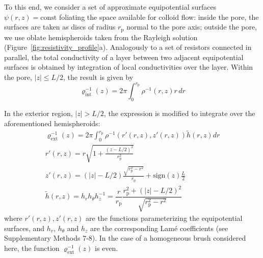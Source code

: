 \documentclass[12pt, a4paper]{article}
\begin{document}

To this end, we consider a set of approximate equipotential surfaces $\psi(r,z)=\text{const}$ foliating the space available for colloid flow: inside the pore, the surfaces are taken as  discs of radius $r_{\text{p}}$ normal to the pore axis; outside the pore, we use oblate hemispheroids taken from the Rayleigh solution \cite{Strutt1878} (Figure~\ref{fig:resistivity_profile}a).
Analogously to a set of resistors connected in parallel, the total conductivity of a layer between two adjacent equipotential surfaces is obtained by integration of local conductivities over the layer. Within the pore, $|z|\leq L/2$, the result is given by
\begin{equation}
\varrho_{\text{int}}^{-1}(z)= 2\pi\int_{0}^{r_{\text{p}}^{}} \rho^{-1}(r,z) r \, dr
\label{eq:varrho1}
\end{equation}

In the exterior region, $|z| >L/2$, the expression is modified to integrate over the aforementioned hemispheroids:
\begin{equation}
    \begin{gathered}
        \varrho_{\text{ext}}^{-1}(z)= 2\pi\int_{0}^{r_{\text{p}}^{}} \rho^{-1}\left( r'(r,z), z'(r,z) \right)  \tilde{h} (r,z) dr\\
        r'(r,z) = r\sqrt{1 + \frac{(z - L/2)^2}{r_{\text{p}}^2}}\\
        z'(r,z) = (|z| - L/2) \frac{\sqrt{r_{\text{p}}^2 - r^2}}{r_{\text{p}}} +  \text{sign}(z) \frac{L}{2}\\
        \tilde{h} (r,z) = h_r h_{\theta} h_z^{-1} = \dfrac{r}{r_{\text{p}}}\dfrac{r_{\text{p}}^2 + (|z|-L/2)^2}{\sqrt{r_{\text{p}}^2 - r^2}}
    \end{gathered}
\label{eq:varrho2}
\end{equation}
where $r'(r,z) , z'(r,z)$ are the functions parameterizing the equipotential surfaces, and $h_r$, $h_{\theta}$ and $h_z$ are the corresponding Lam\'e coefficients (see Supplementary Methods 7-8). In the case of a homogeneous brush considered here, the function $\varrho_{\text{ext}}^{-1}(z)$ is even.
\end{document}
